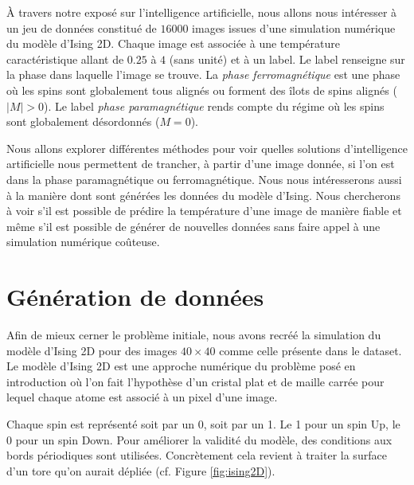 \documentclass[11pt, parskip=half]{scrartcl} %
\begin{document}
À travers notre exposé sur l'intelligence artificielle, nous allons nous intéresser à un jeu de données constitué de $16 000$ images issues d'une simulation numérique du modèle d'Ising 2D. Chaque image est associée à une température caractéristique allant de $0.25$ à $4$ (sans unité) et à un label. Le label renseigne sur la phase dans laquelle l'image se trouve. La \textit{phase ferromagnétique} est une phase où les spins sont globalement tous alignés ou forment des îlots de spins alignés ($|M| > 0$). Le label \textit{phase paramagnétique} rends compte du régime où les spins sont globalement désordonnés ($M = 0$).


Nous allons explorer différentes méthodes pour voir quelles solutions d'intelligence artificielle nous permettent de trancher, à partir d'une image donnée, si l'on est dans la phase paramagnétique ou ferromagnétique. Nous nous intéresserons aussi à la manière dont sont générées les données du modèle d'Ising. Nous chercherons à voir s'il est possible de prédire la température d'une image de manière fiable et même s'il est possible de générer de nouvelles données sans faire appel à une simulation numérique coûteuse.

\section{Génération de données}
Afin de mieux cerner le problème initiale, nous avons recréé la simulation du modèle d'Ising 2D pour des images $40 \times 40$ comme celle présente dans le dataset.
Le modèle d'Ising 2D est une approche numérique du problème posé en introduction où l'on fait l'hypothèse d'un cristal plat et de maille carrée pour lequel chaque atome est associé à un pixel d'une image.


Chaque spin est représenté soit par un 0, soit par un 1. Le 1 pour un spin Up, le 0 pour un spin Down. Pour améliorer la validité du modèle, des conditions aux bords périodiques sont utilisées. Concrètement cela revient à traiter la surface d'un tore qu'on aurait dépliée (cf. Figure \ref{fig:ising2D}). 
\end{document}
